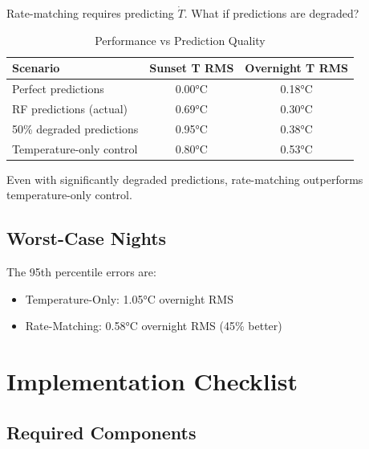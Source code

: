 \documentclass[11pt,letterpaper]{article}
\begin{document}
Rate-matching requires predicting $\dot{T}$. What if predictions are degraded?

\begin{table}[H]
\centering
\caption{Performance vs Prediction Quality}
\label{tab:pred_quality}
\begin{tabular}{l|cc}
\toprule
\textbf{Scenario} & \textbf{Sunset T RMS} & \textbf{Overnight T RMS} \\
\midrule
Perfect predictions & 0.00°C & 0.18°C \\
RF predictions (actual) & 0.69°C & 0.30°C \\
50\% degraded predictions & 0.95°C & 0.38°C \\
Temperature-only control & 0.80°C & 0.53°C \\
\bottomrule
\end{tabular}
\end{table}

Even with significantly degraded predictions, rate-matching outperforms temperature-only control.

\subsection{Worst-Case Nights}

The 95th percentile errors are:
\begin{itemize}
    \item Temperature-Only: 1.05°C overnight RMS
    \item Rate-Matching: 0.58°C overnight RMS (45\% better)
\end{itemize}

\section{Implementation Checklist}

\subsection{Required Components}
\end{document}
